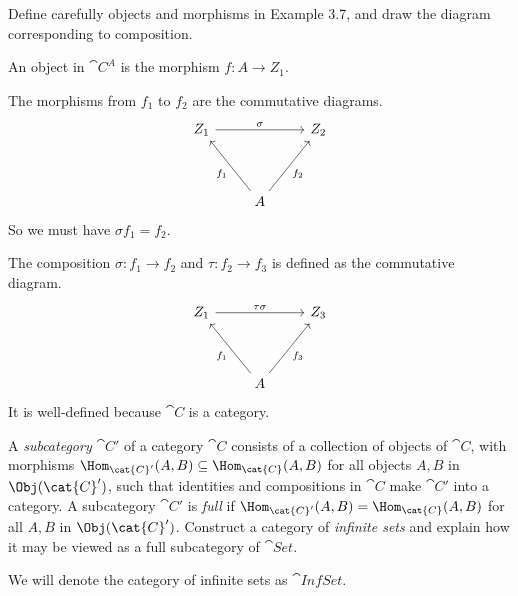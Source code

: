 \documentclass[parskip=full, draft]{scrartcl}
\begin{document}
\begin{prob}{7}
    Define carefully objects and morphisms in Example 3.7, and draw the diagram corresponding to composition.
\end{prob}
\begin{sol}
    An object in \(\cat{C}^A\) is the morphism \(f: A \to Z_1\).

    The morphisms from \(f_1\) to \(f_2\) are the commutative diagrams.
    \[\begin{tikzcd}
        {Z_1} && {Z_2} \\
        \\
        & A
        \arrow["{f_1}", from=3-2, to=1-1]
        \arrow["{f_2}"', from=3-2, to=1-3]
        \arrow["\sigma", from=1-1, to=1-3]
    \end{tikzcd}\]
    So we must have \(\sigma f_1 = f_2\).

    The composition \(\sigma: f_1 \to f_2\) and \(\tau: f_2 \to f_3\) is defined as the commutative diagram.
    \[\begin{tikzcd}
        {Z_1} && {Z_3} \\
        \\
        & A
        \arrow["{f_1}", from=3-2, to=1-1]
        \arrow["{f_3}"', from=3-2, to=1-3]
        \arrow["\tau\sigma", from=1-1, to=1-3]
    \end{tikzcd}\]
    It is well-defined because \(\cat{C}\) is a category.
\end{sol}
\begin{prob}{8}
    A \textit{subcategory} \(\cat{C}'\) of a category \(\cat{C}\) consists of a collection of objects of \(\cat{C}\), with morphisms \(\Hom_{\cat{C}'}(A, B) \subseteq \Hom_{\cat{C}}(A, B)\) for all objects \(A, B\) in \(\Obj(\cat{C}')\), such that identities and compositions in \(\cat{C}\) make \(\cat{C}'\) into a category. A subcategory \(\cat{C}'\) is \textit{full} if \(\Hom_{\cat{C}'} (A, B) = \Hom_{\cat{C}}(A, B)\) for all \(A, B\) in \(\Obj(\cat{C}')\). Construct a category of \textit{infinite sets}  and explain how it may be viewed as a full subcategory of \(\cat{Set}\).
\end{prob}
\begin{sol}
    We will denote the category of infinite sets as \(\cat{InfSet}\).
\end{sol}
\end{document}
